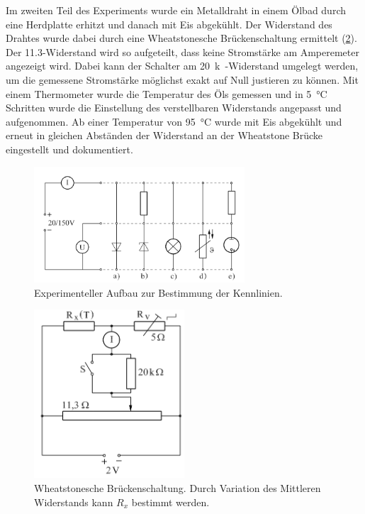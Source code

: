 \documentclass[
	a4paper,
	12pt,
	pagesize,
	ngerman
]{scrartcl}
\begin{document}
	Im zweiten Teil des Experiments wurde ein Metalldraht in einem Ölbad durch eine Herdplatte erhitzt und danach mit Eis abgekühlt.
	Der Widerstand des Drahtes wurde dabei durch eine Wheatstonesche Brückenschaltung ermittelt (\cref{Wheatstone}).
	Der \SI{11,3}{\Omega}-Widerstand wird so aufgeteilt, dass keine Stromstärke am Amperemeter angezeigt wird.
	Dabei kann der Schalter am \SI{20}{k\Omega}-Widerstand umgelegt werden, um die gemessene Stromstärke möglichst exakt auf Null justieren zu können.
	Mit einem Thermometer wurde die Temperatur des Öls gemessen und in \SI{5}{\celsius} Schritten wurde die Einstellung des verstellbaren Widerstands angepasst und aufgenommen. 
	Ab einer Temperatur von \SI{95}{\celsius} wurde mit Eis abgekühlt und erneut in gleichen Abständen der Widerstand an der Wheatstone Brücke eingestellt und dokumentiert.
	\begin{figure}[H]
		\includegraphics[width=0.7\textwidth]{Aufbau}
		\centering
		\caption{Experimenteller Aufbau zur Bestimmung der Kennlinien.\cite{WWU}} 
		\label{Aufbau}
		\centering
	\end{figure} 	
	\begin{figure}[H]
		\includegraphics[width=0.5\textwidth]{Wheatstone}
		\centering
		\caption{Wheatstonesche Brückenschaltung. Durch Variation des Mittleren Widerstands kann $R_x$ bestimmt werden.\cite{WWU}} 
		\label{Wheatstone}
		\centering
	\end{figure} 	
	
\end{document}
